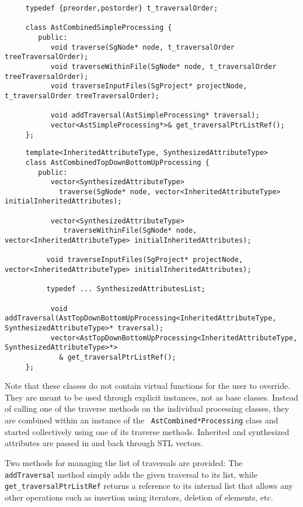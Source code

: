 {\indent
{\mySmallFontSize
\begin{verbatim}
     typedef {preorder,postorder} t_traversalOrder;

     class AstCombinedSimpleProcessing {
        public:
           void traverse(SgNode* node, t_traversalOrder treeTraversalOrder);
           void traverseWithinFile(SgNode* node, t_traversalOrder treeTraversalOrder);
           void traverseInputFiles(SgProject* projectNode, t_traversalOrder treeTraversalOrder);

           void addTraversal(AstSimpleProcessing* traversal);
           vector<AstSimpleProcessing*>& get_traversalPtrListRef();
     };
\end{verbatim}
}}

{\indent
{\mySmallFontSize
\begin{verbatim}
     template<InheritedAttributeType, SynthesizedAttributeType>
     class AstCombinedTopDownBottomUpProcessing {
        public:
           vector<SynthesizedAttributeType> 
             traverse(SgNode* node, vector<InheritedAttributeType> initialInheritedAttributes);
          
           vector<SynthesizedAttributeType> 
              traverseWithinFile(SgNode* node, vector<InheritedAttributeType> initialInheritedAttributes);
          
          void traverseInputFiles(SgProject* projectNode, vector<InheritedAttributeType> initialInheritedAttributes);
          
          typedef ... SynthesizedAttributesList;

           void addTraversal(AstTopDownBottomUpProcessing<InheritedAttributeType, SynthesizedAttributeType>* traversal);
           vector<AstTopDownBottomUpProcessing<InheritedAttributeType, SynthesizedAttributeType>*>
             & get_traversalPtrListRef();
     };
\end{verbatim}
}}

Note that these classes do not contain virtual functions for the user to
override. They are meant to be used through explicit instances, not as base
classes. Instead of calling one of the traverse methods on the individual
processing classes, they are combined within an instance of the {\tt
AstCombined*Processing} class and started collectively using one of its
traverse methods. Inherited and synthesized attributes are passed in and back
through STL vectors.

Two methods for managing the list of traversals are provided: The {\tt
addTraversal} method simply adds the given traversal to its list, while {\tt
get\_traversalPtrListRef} returns a reference to its internal list that allows
any other operations such as insertion using iterators, deletion of elements,
etc.

